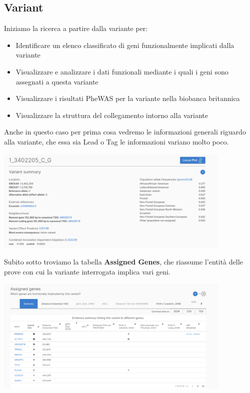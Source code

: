 \documentclass{article}
\begin{document}
\subsection{Variant}
\begin{box4}
    [title={\textbf{Ricerca per Variante}}]
    {Iniziamo la ricerca a partire dalla variante per:
    \begin{itemize}
        \item Identificare un elenco classificato di geni funzionalmente implicati dalla variante
        \item Visualizzare e analizzare i dati funzionali mediante i quali i geni sono assegnati a questa variante
        \item Visualizzare i risultati PheWAS per la variante nella biobanca britannica
        \item Visualizzare la struttura del collegamento intorno alla variante
    \end{itemize}}
\end{box4}
Anche in questo caso per prima cosa vedremo le informazioni generali riguardo alla variante, che essa sia Lead o Tag le informazioni variano molto poco.
\begin{center}
    \includegraphics[width=0.85\textwidth]{figures/9-Variante.png}
\end{center}
Subito sotto troviamo la tabella \textbf{Assigned Genes}, che riassume l'entità delle prove con cui la variante interrogata implica vari geni. 
\begin{center}
    \includegraphics[width=0.85\textwidth]{figures/10-Variante.png}
\end{center}
\end{document}
